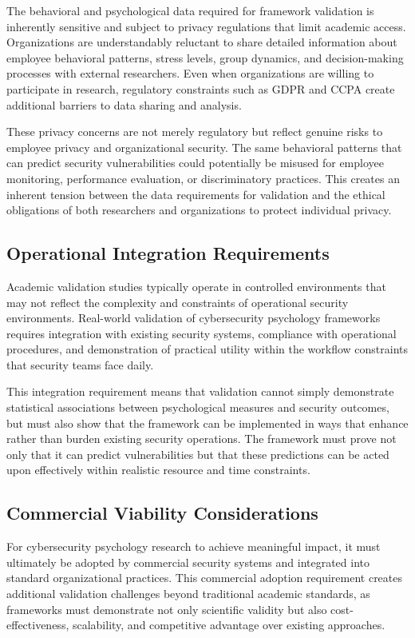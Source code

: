 \documentclass[10pt,twocolumn]{IEEEtran}
\begin{document}
The behavioral and psychological data required for framework validation is inherently sensitive and subject to privacy regulations that limit academic access. Organizations are understandably reluctant to share detailed information about employee behavioral patterns, stress levels, group dynamics, and decision-making processes with external researchers. Even when organizations are willing to participate in research, regulatory constraints such as GDPR and CCPA create additional barriers to data sharing and analysis.

These privacy concerns are not merely regulatory but reflect genuine risks to employee privacy and organizational security. The same behavioral patterns that can predict security vulnerabilities could potentially be misused for employee monitoring, performance evaluation, or discriminatory practices. This creates an inherent tension between the data requirements for validation and the ethical obligations of both researchers and organizations to protect individual privacy.

\subsection{Operational Integration Requirements}

Academic validation studies typically operate in controlled environments that may not reflect the complexity and constraints of operational security environments. Real-world validation of cybersecurity psychology frameworks requires integration with existing security systems, compliance with operational procedures, and demonstration of practical utility within the workflow constraints that security teams face daily.

This integration requirement means that validation cannot simply demonstrate statistical associations between psychological measures and security outcomes, but must also show that the framework can be implemented in ways that enhance rather than burden existing security operations. The framework must prove not only that it can predict vulnerabilities but that these predictions can be acted upon effectively within realistic resource and time constraints.

\subsection{Commercial Viability Considerations}

For cybersecurity psychology research to achieve meaningful impact, it must ultimately be adopted by commercial security systems and integrated into standard organizational practices. This commercial adoption requirement creates additional validation challenges beyond traditional academic standards, as frameworks must demonstrate not only scientific validity but also cost-effectiveness, scalability, and competitive advantage over existing approaches.
\end{document}
